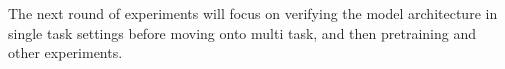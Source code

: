 The next round of experiments will focus on verifying the model architecture in single task settings before moving onto multi task, and then pretraining and other experiments. 


%
